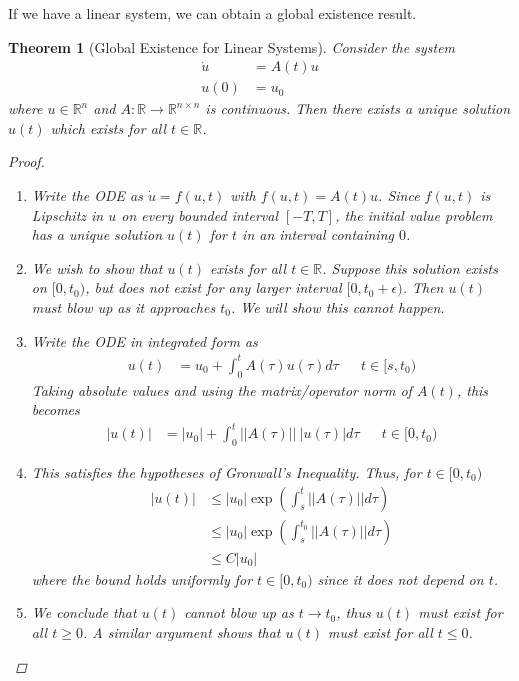 \documentclass[10pt]{article}         %
\newtheorem{theorem}{Theorem}[section]
\theoremstyle{remark}
\newcommand{\R}{\mathbb{R}}
\begin{document}
If we have a linear system, we can obtain a global existence result. 
\begin{theorem}[Global Existence for Linear Systems]
Consider the system
\begin{align*}
\dot{u} &= A(t) u \\
u(0) &= u_0
\end{align*}
where $u \in \R^n$ and $A:\R \rightarrow \R^{n \times n}$ is continuous. Then there exists a unique solution $u(t)$ which exists for all $t \in \R$.
\begin{proof}
\begin{enumerate}
\item Write the ODE as $\dot{u} = f(u, t)$ with $f(u,t) = A(t) u$. Since $f(u, t)$ is Lipschitz in $u$ on every bounded interval $[-T, T]$, the initial value problem has a unique solution $u(t)$ for $t$ in an interval containing $0$. 
\item We wish to show that $u(t)$ exists for all $t \in \R$. Suppose this solution exists on $[0, t_0)$, but does not exist for any larger interval $[0, t_0 + \epsilon)$. Then $u(t)$ must blow up as it approaches $t_0$. We will show this cannot happen.
\item Write the ODE in integrated form as
\begin{align*}
u(t) &= u_0 + \int_0^t A(\tau)u(\tau)d\tau && t \in [s, t_0)
\end{align*}
Taking absolute values and using the matrix/operator norm of $A(t)$, this becomes
\begin{align*}
|u(t)| &= |u_0| + \int_0^t ||A(\tau)||\:|u(\tau)|d\tau && t \in [0, t_0)
\end{align*}
\item This satisfies the hypotheses of Gronwall's Inequality. Thus, for $t \in [0, t_0)$
\begin{align*}
|u(t)| &\leq |u_0| \exp \left( \int_s^t ||A(\tau)|| d\tau \right) \\
&\leq |u_0| \exp \left( \int_s^{t_0} ||A(\tau)|| d\tau \right) \\
&\leq C |u_0|
\end{align*}
where the bound holds uniformly for $t \in [0, t_0)$ since it does not depend on $t$.
\item We conclude that $u(t)$ cannot blow up as $t \rightarrow t_0$, thus $u(t)$ must exist for all $t \geq 0$. A similar argument shows that $u(t)$ must exist for all $t \leq 0$.
\end{enumerate}
\end{proof}
\end{theorem}
\end{document}
